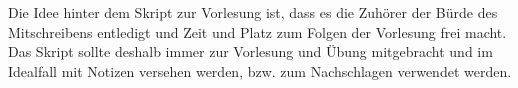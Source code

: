 \glsunsetall
%
\maketitle
\tableofcontents
\clearpage
%
\listoffigures
{}
\listoflistings
{}
\clearpage
%
\pretocmd{\section}{\FloatBarrier\clearpage}{}{}
\pretocmd{\subsection}{\FloatBarrier}{}{}
%
\glsresetall
\setcounter{page}{1}

\begin{center}
    \begin{minipage}{0.6\textwidth}
        Die Idee hinter dem Skript zur Vorlesung ist, dass es die Zuh\"orer der B\"urde des Mitschreibens entledigt und Zeit und Platz zum Folgen der Vorlesung frei macht.
        Das Skript sollte deshalb immer zur Vorlesung und \"Ubung mitgebracht und im Idealfall mit Notizen versehen werden, bzw. zum Nachschlagen verwendet werden.
    \end{minipage}
\end{center}